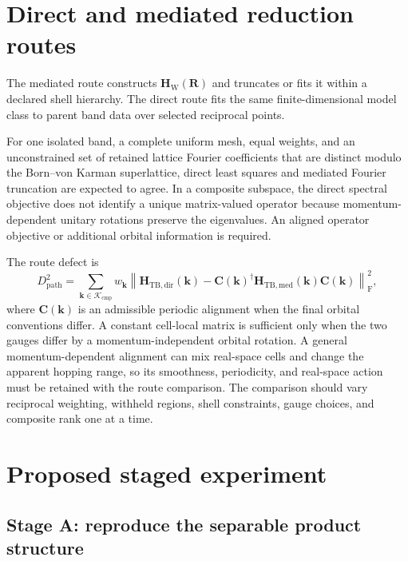 \section*{Direct and mediated reduction routes}

The mediated route constructs $\mathbf H_{\mathrm W}(\mathbf R)$ and truncates
or fits it within a declared shell hierarchy. The direct route fits the same
finite-dimensional model class to parent band data over selected reciprocal
points.

For one isolated band, a complete uniform mesh, equal weights, and an
unconstrained set of retained lattice Fourier coefficients that are distinct
modulo the Born--von Karman superlattice, direct least squares and mediated
Fourier truncation are expected to agree. In a composite subspace,
the direct spectral objective does not identify a unique matrix-valued operator
because momentum-dependent unitary rotations preserve the eigenvalues. An
aligned operator objective or additional orbital information is required.

The route defect is
\begin{equation}
    D_{\mathrm{path}}^2
    =
    \sum_{\mathbf k\in\mathcal K_{\mathrm{cmp}}}
    w_{\mathbf k}
    \left\lVert
        \mathbf H_{\mathrm{TB,dir}}(\mathbf k)
        -
        \mathbf C(\mathbf k)^\dagger
        \mathbf H_{\mathrm{TB,med}}(\mathbf k)
        \mathbf C(\mathbf k)
    \right\rVert_{\mathrm F}^2,
\end{equation}
where $\mathbf C(\mathbf k)$ is an admissible periodic alignment when the
final orbital conventions differ. A constant cell-local matrix is sufficient
only when the two gauges differ by a momentum-independent orbital rotation. A
general momentum-dependent alignment can mix real-space cells and change the
apparent hopping range, so its smoothness, periodicity, and real-space action
must be retained with the route comparison. The comparison should vary
reciprocal weighting, withheld regions, shell constraints, gauge choices, and
composite rank one at a time.

\section*{Proposed staged experiment}

\subsection*{Stage A: reproduce the separable product structure}

